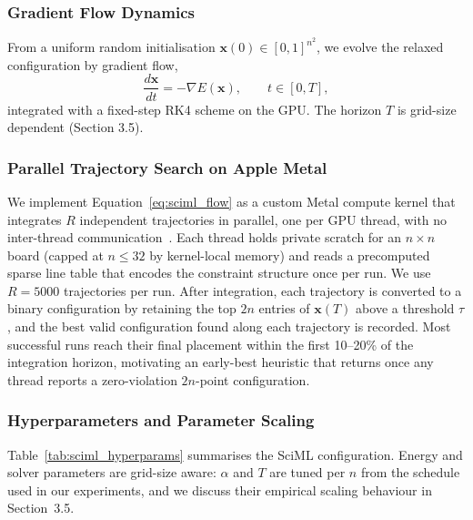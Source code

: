 \documentclass{article}
\theoremstyle{plain}
\theoremstyle{definition}
\theoremstyle{remark}
\begin{document}
\subsubsection{Gradient Flow Dynamics}

From a uniform random initialisation $\mathbf{x}(0) \in [0,1]^{n^2}$, we evolve the relaxed configuration by gradient flow,
\begin{equation}
\frac{d\mathbf{x}}{dt} = -\nabla E(\mathbf{x}), \qquad t \in [0,T],
\label{eq:sciml_flow}
\end{equation}
integrated with a fixed-step RK4 scheme on the GPU. The horizon $T$ is grid-size dependent (Section 3.5).

\subsubsection{Parallel Trajectory Search on Apple Metal}

We implement Equation~\eqref{eq:sciml_flow} as a custom Metal compute kernel that integrates $R$ independent trajectories in parallel, one per GPU thread, with no inter-thread communication~\cite{Metal_jl}. Each thread holds private scratch for an $n \times n$ board (capped at $n \le 32$ by kernel-local memory) and reads a precomputed sparse line table that encodes the constraint structure once per run. We use $R = 5000$ trajectories per run. After integration, each trajectory is converted to a binary configuration by retaining the top $2n$ entries of $\mathbf{x}(T)$ above a threshold $\tau$, and the best valid configuration found along each trajectory is recorded. Most successful runs reach their final placement within the first 10--20\% of the integration horizon, motivating an early-best heuristic that returns once any thread reports a zero-violation $2n$-point configuration.

\subsubsection{Hyperparameters and Parameter Scaling}

Table~\ref{tab:sciml_hyperparams} summarises the SciML configuration. Energy and solver parameters are grid-size aware: $\alpha$ and $T$ are tuned per $n$ from the schedule used in our experiments, and we discuss their empirical scaling behaviour in Section~3.5.
\end{document}
